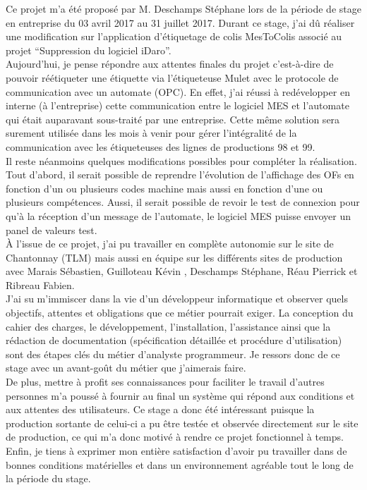 \documentclass[a4paper,12pt]{extarticle}
\begin{document}
	Ce projet m’a été proposé par M. Deschamps Stéphane lors de la période de stage en entreprise du 03 avril 2017 au 31 juillet 2017. Durant ce stage, j’ai dû réaliser une modification sur l’application d’étiquetage de colis MesToColis associé au projet “Suppression du logiciel iDaro”.\\
Aujourd’hui, je pense répondre aux attentes finales du projet c’est-à-dire de pouvoir réétiqueter une étiquette via l’étiqueteuse Mulet avec le protocole de communication avec un automate (OPC). En effet, j’ai réussi à redévelopper en interne (à l’entreprise) cette communication entre le logiciel MES et l’automate qui était auparavant sous-traité par une entreprise. Cette même solution sera surement utilisée dans les mois à venir pour gérer l’intégralité de la communication avec les étiqueteuses des lignes de productions 98 et 99.\\
Il reste néanmoins quelques modifications possibles pour compléter la réalisation. Tout d’abord, il serait possible de reprendre l’évolution de l’affichage des OFs en fonction d’un ou plusieurs codes machine mais aussi en fonction d’une ou plusieurs compétences. Aussi, il serait possible de revoir le test de connexion pour qu’à la réception d’un message de l’automate, le logiciel MES puisse envoyer un panel de valeurs test.\\
À l’issue de ce projet, j’ai pu travailler en complète autonomie sur le site de Chantonnay (TLM) mais aussi en équipe sur les différents sites de production avec Marais Sébastien, Guilloteau Kévin , Deschamps Stéphane, Réau Pierrick et Ribreau Fabien.\\
J’ai su m'immiscer dans la vie d’un développeur informatique et observer quels objectifs, attentes et obligations que ce métier pourrait exiger. La conception du cahier des charges, le développement, l’installation, l’assistance ainsi que la rédaction de documentation (spécification détaillée et procédure d’utilisation) sont des étapes clés du métier d’analyste programmeur. Je ressors donc de ce stage avec un avant-goût du métier que j’aimerais faire.\\
De plus, mettre à profit ses connaissances pour faciliter le travail d’autres personnes m’a poussé à fournir au final un système qui répond aux conditions et aux attentes des utilisateurs. Ce stage a donc été intéressant puisque la production sortante de celui-ci a pu être testée et observée directement sur le site de production, ce qui m’a donc motivé à rendre ce projet fonctionnel à temps.\\
Enfin, je tiens à exprimer mon entière satisfaction d’avoir pu travailler dans de bonnes conditions matérielles et dans un environnement agréable tout le long de la période du stage.\\
\end{document}
